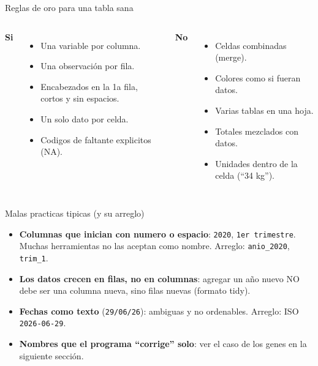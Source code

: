 \documentclass[aspectratio=169]{beamer}
\begin{document}
\begin{frame}{Reglas de oro para una tabla sana}
  \begin{columns}[t]
      \textbf{Si}
      \begin{itemize}
        \item Una variable por columna.
        \item Una observaci\'on por fila.
        \item Encabezados en la 1a fila, cortos y sin espacios.
        \item Un solo dato por celda.
        \item Codigos de faltante explicitos (NA).
      \end{itemize}
      \textbf{No}
      \begin{itemize}
        \item Celdas combinadas (merge).
        \item Colores como si fueran datos.
        \item Varias tablas en una hoja.
        \item Totales mezclados con datos.
        \item Unidades dentro de la celda (``34 kg'').
      \end{itemize}
  \end{columns}
\end{frame}

\begin{frame}[fragile]{Malas practicas tipicas (y su arreglo)}
  \begin{itemize}
    \item \textbf{Columnas que inician con numero o espacio}: \texttt{2020},
          \texttt{1er trimestre}. Muchas herramientas no las aceptan como nombre.
          Arreglo: \texttt{anio\_2020}, \texttt{trim\_1}.
    \item \textbf{Los datos crecen en filas, no en columnas}: agregar un a\~no
          nuevo NO debe ser una columna nueva, sino filas nuevas (formato tidy).
    \item \textbf{Fechas como texto} (\texttt{29/06/26}): ambiguas y no ordenables.
          Arreglo: ISO \texttt{2026-06-29}.
    \item \textbf{Nombres que el programa ``corrige'' solo}: ver el caso de los
          genes en la siguiente secci\'on.
  \end{itemize}
\end{frame}

\end{document}
